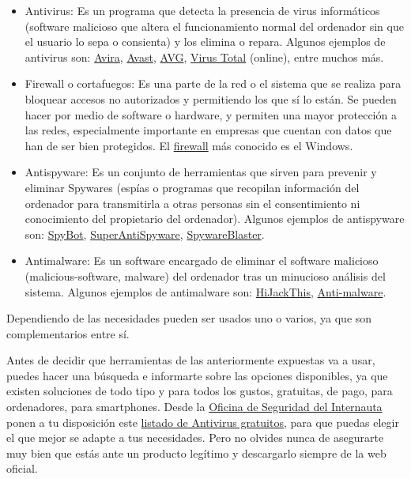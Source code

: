 \documentclass[
  a4paper,
  openany]{book}
\begin{document}
\begin{itemize}
\item
  Antivirus: Es un programa que detecta la presencia de virus informáticos (software malicioso que altera el funcionamiento normal del ordenador sin que el usuario lo sepa o consienta) y los elimina o repara. Algunos ejemplos de antivirus son: \href{https://www.avira.com/es}{Avira}, \href{https://www.avast.com/es-es/index\#pc}{Avast}, \href{https://www.avg.com/es-es/homepage\#pc}{AVG}, \href{https://www.virustotal.com/gui/}{Virus Total} (online), entre muchos más.
\item
  Firewall o cortafuegos: Es una parte de la red o el sistema que se realiza para bloquear accesos no autorizados y permitiendo los que sí lo están. Se pueden hacer por medio de software o hardware, y permiten una mayor protección a las redes, especialmente importante en empresas que cuentan con datos que han de ser bien protegidos. El \href{https://en.wikipedia.org/wiki/Windows_Firewall}{firewall} más conocido es el Windows.
\item
  Antispyware: Es un conjunto de herramientas que sirven para prevenir y eliminar Spywares (espías o programas que recopilan información del ordenador para transmitirla a otras personas sin el consentimiento ni conocimiento del propietario del ordenador). Algunos ejemplos de antispyware son: \href{https://www.safer-networking.org/}{SpyBot}, \href{https://www.superantispyware.com/}{SuperAntiSpyware}, \href{https://www.brightfort.com/spywareblaster.html}{SpywareBlaster}.
\item
  Antimalware: Es un software encargado de eliminar el software malicioso (malicious-software, malware) del ordenador tras un minucioso análisis del sistema. Algunos ejemplos de antimalware son: \href{https://www.infospyware.com/antimalware/hijackthis/}{HiJackThis}, \href{https://www.malwarebytes.com/}{Anti-malware}.
\end{itemize}

Dependiendo de las necesidades pueden ser usados uno o varios, ya que son complementarios entre sí.

Antes de decidir que herramientas de las anteriormente expuestas va a usar, puedes hacer una búsqueda e informarte sobre las opciones disponibles, ya que existen soluciones de todo tipo y para todos los gustos, gratuitas, de pago, para ordenadores, para smartphones. Desde la \href{https://www.osi.es}{Oficina de Seguridad del Internauta} ponen a tu disposición este \href{https://www.osi.es/es/herramientas-gratuitas?herramienta_selec\%5B0\%5D=115}{listado de Antivirus gratuitos}, para que puedas elegir el que mejor se adapte a tus necesidades. Pero no olvides nunca de asegurarte muy bien que estás ante un producto legítimo y descargarlo siempre de la web oficial.
\end{document}
